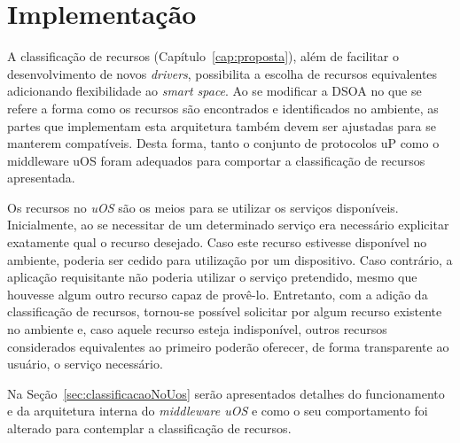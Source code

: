 \chapter{Implementação}

A classificação de recursos (Capítulo~\ref{cap:proposta}), além de facilitar o desenvolvimento de novos \emph{drivers}, possibilita a escolha de recursos equivalentes adicionando flexibilidade ao \emph{smart space}. Ao se modificar a DSOA no que se refere a forma como os recursos são encontrados e identificados no ambiente, as partes que implementam esta arquitetura também devem ser ajustadas para se manterem compatíveis. Desta forma, tanto o conjunto de protocolos uP como o middleware uOS foram adequados para comportar a classificação de recursos apresentada.

Os recursos no \emph{uOS} são os meios para se utilizar os serviços disponíveis. Inicialmente, ao se necessitar de um determinado serviço era necessário explicitar exatamente qual o recurso desejado. Caso este recurso estivesse disponível no ambiente, poderia ser cedido para utilização por um dispositivo. Caso contrário, a aplicação requisitante não poderia utilizar o serviço pretendido, mesmo que houvesse algum outro recurso capaz de provê-lo. Entretanto, com a adição da classificação de recursos, tornou-se possível solicitar por algum recurso existente no ambiente e, caso aquele recurso esteja indisponível, outros recursos considerados equivalentes ao primeiro poderão oferecer, de forma transparente ao usuário, o serviço necessário.

Na Seção~\ref{sec:classificacaoNoUos} serão apresentados detalhes do funcionamento e da arquitetura interna do \emph{middleware uOS} e como o seu comportamento foi alterado para contemplar a classificação de recursos.


